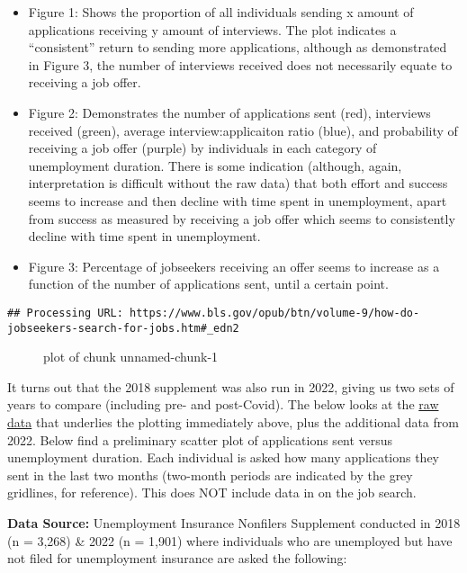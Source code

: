 \begin{itemize}
\item
  Figure 1: Shows the proportion of all individuals sending x amount of
  applications receiving y amount of interviews. The plot indicates a
  ``consistent'' return to sending more applications, although as
  demonstrated in Figure 3, the number of interviews received does not
  necessarily equate to receiving a job offer.
\item
  Figure 2: Demonstrates the number of applications sent (red),
  interviews received (green), average interview:applicaiton ratio
  (blue), and probability of receiving a job offer (purple) by
  individuals in each category of unemployment duration. There is some
  indication (although, again, interpretation is difficult without the
  raw data) that both effort and success seems to increase and then
  decline with time spent in unemployment, apart from success as
  measured by receiving a job offer which seems to consistently decline
  with time spent in unemployment.
\item
  Figure 3: Percentage of jobseekers receiving an offer seems to
  increase as a function of the number of applications sent, until a
  certain point.
\end{itemize}

\begin{verbatim}
## Processing URL: https://www.bls.gov/opub/btn/volume-9/how-do-jobseekers-search-for-jobs.htm#_edn2
\end{verbatim}

\begin{figure}
\centering
{}
\caption{plot of chunk unnamed-chunk-1}
\end{figure}

It turns out that the 2018 supplement was also run in 2022, giving us
two sets of years to compare (including pre- and post-Covid). The below
looks at the
\href{https://www.census.gov/data/datasets/time-series/demo/cps/cps-supp_cps-repwgt/cps-unemployment.2022.html\#list-tab-1269561637}{raw
data} that underlies the plotting immediately above, plus the additional
data from 2022. Below find a preliminary scatter plot of applications
sent versus unemployment duration. Each individual is asked how many
applications they sent in the last two months (two-month periods are
indicated by the grey gridlines, for reference). This does NOT include
data in on the job search.

\textbf{Data Source:} Unemployment Insurance Nonfilers Supplement
conducted in 2018 (n = 3,268) \& 2022 (n = 1,901) where individuals who
are unemployed but have not filed for unemployment insurance are asked
the following:


